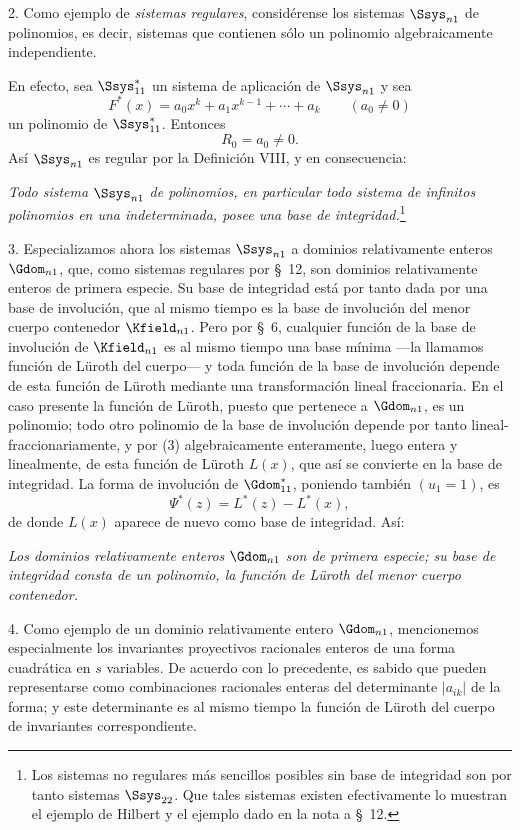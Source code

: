 \documentclass[11pt]{article}
\begin{document}
2. Como ejemplo de \emph{sistemas regulares}, considérense los sistemas $\Ssys_{n1}$ de polinomios, es decir, sistemas que contienen sólo un polinomio algebraicamente independiente.

En efecto, sea $\Ssys^*_{11}$ un sistema de aplicación de $\Ssys_{n1}$ y sea
\[
  F^*(x)=a_0x^k+a_1x^{k-1}+\cdots+a_k\qquad(a_0\ne0)
\]
un polinomio de $\Ssys^*_{11}$. Entonces
\begin{equation}
  R_0=a_0\ne0.
\tag{3}
\end{equation}
Así $\Ssys_{n1}$ es regular por la Definición VIII, y en consecuencia:

\emph{Todo sistema $\Ssys_{n1}$ de polinomios, en particular todo sistema de infinitos polinomios en una indeterminada, posee una base de integridad.}\footnote{Los sistemas no regulares más sencillos posibles sin base de integridad son por tanto sistemas $\Ssys_{22}$. Que tales sistemas existen efectivamente lo muestran el ejemplo de Hilbert y el ejemplo dado en la nota a \S\ 12.}

3. Especializamos ahora los sistemas $\Ssys_{n1}$ a dominios relativamente enteros $\Gdom_{n1}$, que, como sistemas regulares por \S\ 12, son dominios relativamente enteros de primera especie. Su base de integridad está por tanto dada por una base de involución, que al mismo tiempo es la base de involución del menor cuerpo contenedor $\Kfield_{n1}$. Pero por \S\ 6, cualquier función de la base de involución de $\Kfield_{n1}$ es al mismo tiempo una base mínima ---la llamamos función de Lüroth del cuerpo--- y toda función de la base de involución depende de esta función de Lüroth mediante una transformación lineal fraccionaria. En el caso presente la función de Lüroth, puesto que pertenece a $\Gdom_{n1}$, es un polinomio; todo otro polinomio de la base de involución depende por tanto lineal-fraccionariamente, y por (3) algebraicamente enteramente, luego entera y linealmente, de esta función de Lüroth $L(x)$, que así se convierte en la base de integridad. La forma de involución de $\Gdom^*_{11}$, poniendo también $(u_1=1)$, es
\[
  \Psi^*(z)=L^*(z)-L^*(x),
\]
de donde $L(x)$ aparece de nuevo como base de integridad. Así:

\emph{Los dominios relativamente enteros $\Gdom_{n1}$ son de primera especie; su base de integridad consta de un polinomio, la función de Lüroth del menor cuerpo contenedor.}

4. Como ejemplo de un dominio relativamente entero $\Gdom_{n1}$, mencionemos especialmente los invariantes proyectivos racionales enteros de una forma cuadrática en $s$ variables. De acuerdo con lo precedente, es sabido que pueden representarse como combinaciones racionales enteras del determinante $|a_{ik}|$ de la forma; y este determinante es al mismo tiempo la función de Lüroth del cuerpo de invariantes correspondiente.
\end{document}
